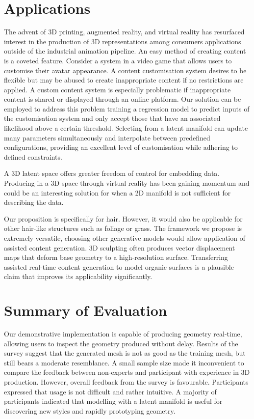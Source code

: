 \documentclass[ %
author={Dillon Keith Diep},
supervisor={Dr. Carl Henrik Ek},
degree={MEng},
title={ART-CG Hair:},
subtitle={Assisted Real-time Content Generation of Stylised Virtual Hair},
type={Research},
year={2017} ]{dissertation}
\begin{document}
	\section{Applications}
	\label{evaluation:application}
	The advent of 3D printing, augmented reality, and virtual reality has resurfaced interest in the production of 3D representations among consumers applications outside of the industrial animation pipeline. An easy method of creating content is a coveted feature. Consider a system in a video game that allows users to customise their avatar appearance. A content customisation system desires to be flexible but may be abused to create inappropriate content if no restrictions are applied. A custom content system is especially problematic if inappropriate content is shared or displayed through an online platform. Our solution can be employed to address this problem training a regression model to predict inputs of the customisation system and only accept those that have an associated likelihood above a certain threshold. Selecting from a latent manifold can update many parameters simultaneously and interpolate between predefined configurations, providing an excellent level of customisation while adhering to defined constraints.
	
	A 3D latent space offers greater freedom of control for embedding data. Producing in a 3D space through virtual reality has been gaining momentum and could be an interesting solution for when a 2D manifold is not sufficient for describing the data.
	
	Our proposition is specifically for hair. However, it would also be applicable for other hair-like structures such as foliage or grass. The framework we propose is extremely versatile, choosing other generative models would allow application of assisted content generation. 3D sculpting often produces vector displacement maps that deform base geometry to a high-resolution surface. Transferring assisted real-time content generation to model organic surfaces is a plausible claim that improves its applicability significantly.
	
	\section{Summary of Evaluation}
	Our demonstrative implementation is capable of producing geometry real-time, allowing users to inspect the geometry produced without delay. Results of the survey suggest that the generated mesh is not as good as the training mesh, but still bears a moderate resemblance.
	A small sample size made it inconvenient to compare the feedback between non-experts and participant with experience in 3D production. However, overall feedback from the survey is favourable. Participants expressed that usage is not difficult and rather intuitive. A majority of participants indicated that modelling with a latent manifold is useful for discovering new styles and rapidly prototyping geometry.
	
\end{document}
